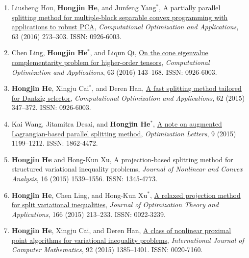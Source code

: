\begin{enumerate}
\item Liusheng Hou, {\bf\color{black}Hongjin He}, and Junfeng Yang$^*$, \href{http://link.springer.com/article/10.1007\%2Fs10589-015-9770-4}{\color{blue}A partially parallel splitting method for multiple-block separable convex programming with applications to robust PCA}, {\it Computational Optimization and Applications}, 63 (2016) 273--303. ISSN: 0926-6003.

\item Chen Ling, {\bf\color{black}Hongjin He}$^*$, and Liqun Qi, \href{http://link.springer.com/article/10.1007/s10589-015-9767-z}{\color{blue}On the cone eigenvalue complementarity problem for higher-order tensors}, {\it Computational Optimization and Applications}, 63 (2016) 143--168. ISSN: 0926-6003.

\item {\bf\color{black}Hongjin He}, Xingju Cai$^*$, and Deren Han, \href{http://link.springer.com/article/10.1007/s10589-015-9748-2}{\color{blue}A fast splitting method tailored for Dantzig selector}, {\it Computational Optimization and Applications}, 62 (2015) 347--372. ISSN: 0926-6003.


\item Kai Wang, Jitamitra Desai, and {\bf\color{black}Hongjin He}$^*$, \href{http://link.springer.com/article/10.1007/s11590-014-0825-8}{A note on augmented Lagrangian-based parallel splitting method}, {\it Optimization Letters}, 9 (2015) 1199--1212. ISSN: 1862-4472.

\item {\bf\color{black}Hongjin He} and Hong-Kun Xu, A projection-based splitting method for structured variational inequality problems, {\it Journal of Nonlinear and Convex Analysis}, 16 (2015) 1539--1556. ISSN: 1345-4773.

\item {\bf\color{black}Hongjin He}, Chen Ling, and Hong-Kun Xu$^*$, \href{http://link.springer.com/article/10.1007\%2Fs10957-014-0598-3}{\color{blue}A relaxed projection method for split variational inequalities}, {\it Journal of Optimization Theory and Applications}, 166 (2015) 213--233. ISSN: 0022-3239.

\item {\bf\color{black}Hongjin He}, Xingju Cai, and Deren Han, \href{http://www.tandfonline.com/doi/abs/10.1080/00207160.2014.940333}{A class of nonlinear proximal point algorithms for variational inequality problems}, {\it International Journal of Computer Mathematics}, {92} (2015) 1385--1401. ISSN: 0020-7160.


\end{enumerate}
